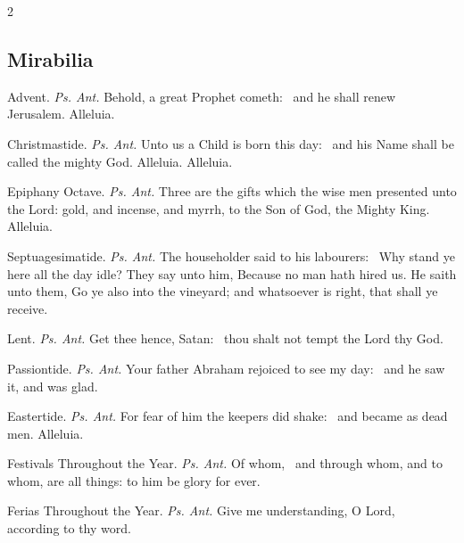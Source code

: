\begin{multicols}{2}
\subsection{Mirabilia}
\par\noindent
{\color{RubricRed}Advent.} \textit{Ps. Ant.} Behold, a great Prophet cometh:~{\dag} and he shall renew Jerusalem. Alleluia.
\par\noindent
{\color{RubricRed}Christmastide.} \textit{Ps. Ant.} Unto us a Child is born this day:~{\dag} and his Name shall be called the mighty God. Alleluia. Alleluia.
\par\noindent
{\color{RubricRed}Epiphany Octave.} \textit{Ps. Ant.} Three are the gifts which the wise men presented unto the Lord: gold, and incense, and myrrh, to the Son of God, the Mighty King. Alleluia.
\par\noindent
{\color{RubricRed}Septuagesimatide.} \textit{Ps. Ant.} The householder said to his labourers:~{\dag} Why stand ye here all the day idle? They say unto him, Because no man hath hired us. He saith unto them, Go ye also into the vineyard; and whatsoever is right, that shall ye receive.
\par\noindent
{\color{RubricRed}Lent.} \textit{Ps. Ant.} Get thee hence, Satan:~{\dag} thou shalt not tempt the Lord thy God.
\par\noindent
{\color{RubricRed}Passiontide.} \textit{Ps. Ant.} Your father Abraham rejoiced to see my day:~{\dag} and he saw it, and was glad.
\par\noindent
{\color{RubricRed}Eastertide.} \textit{Ps. Ant.} For fear of him the keepers did shake:~{\dag} and became as dead men. Alleluia.
\par\noindent
{\color{RubricRed}Festivals Throughout the Year.} \textit{Ps. Ant.} Of whom,~{\dag} and through whom, and to whom, are all things: to him be glory for ever.
\par\noindent
{\color{RubricRed}Ferias Throughout the Year.} \textit{Ps. Ant.} Give me understanding, O Lord,~{\dag} according to thy word.\\


\end{multicols}
